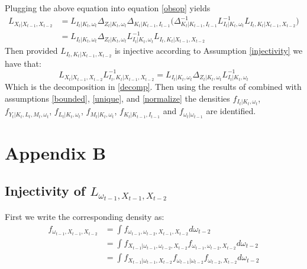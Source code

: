 \documentclass{article}
\begin{document}
Plugging the above equation into equation \eqref{obsop} yields
\begin{equation*}
\begin{split}
L_{X_{t}|X_{t-1}, X_{t-2}}&=L_{I_{t}|K_{t}, \omega_{t}}\Delta_{Z_{t}|K_{t}, \omega_{t}}\Delta_{K_{t}|K_{t-1}, I_{t-1}}\Bigg(\Delta^{-1}_{K_{t}|K_{t-1}, I_{t-1}}L^{-1}_{I_{t}|K_{t}, \omega_{t}}L_{I_{t}, K_{t}|X_{t-1}, X_{t-2}}\Bigg)\\
&=L_{I_{t}|K_{t}, \omega_{t}}\Delta_{Z_{t}|K_{t}, \omega_{t}}L^{-1}_{I_{t}|K_{t}, \omega_{t}}L_{I_{t}, K_{t}|X_{t-1}, X_{t-2}}
\end{split}
\end{equation*}
Then provided $L_{I_{t}, K_{t}|X_{t-1}, X_{t-2}}$ is injective according to Assumption \eqref{injectivity} we have that:
\begin{equation*}
L_{X_{t}|X_{t-1}, X_{t-2}}L^{-1}_{I_{t}, K_{t}|X_{t-1}, X_{t-2}}=L_{I_{t}|K_{t}, \omega_{t}}\Delta_{Z_{t}|K_{t}, \omega_{t}}L^{-1}_{I_{t}|K_{t}, \omega_{t}}
\end{equation*}
Which is the decomposition in \eqref{decomp}. Then using the results of \cite{Hu2008} combined with assumptions \eqref{bounded}, \eqref{unique}, and \eqref{normalize} the densities $f_{I_{t}|K_{t}, \omega_{t}}$, $f_{Y_{t}|K_{t}, L_{t}, M_{t}, \omega_{t}}$, $f_{L_{t}|K_{t}, \omega_{t}}$, $f_{M_{t}|K_{t}, \omega_{t}}$, $f_{K_{t}|K_{t-1}, I_{t-1}}$ and $f_{\omega_{t}|\omega_{t-1}}$ are identified.
\pagebreak
\newpage
\section*{Appendix B}
\subsection*{Injectivity of $L_{\omega_{t-1}, X_{t-1}, X_{t-2}}$}
First we write the corresponding density as:
\begin{equation*}
\begin{split}
f_{\omega_{t-1}, X_{t-1}, X_{t-2}}&=\int f_{\omega_{t-1}, \omega_{t-2}, X_{t-1}, X_{t-2}}d\omega_{t-2}\\
&=\int f_{X_{t-1}|\omega_{t-1}, \omega_{t-2}, X_{t-2}}f_{\omega_{t-1}, \omega_{t-2}, X_{t-2}}d\omega_{t-2}\\
&=\int f_{X_{t-1}|\omega_{t-1}, X_{t-2}}f_{\omega_{t-1}|\omega_{t-2}}f_{\omega_{t-2}, X_{t-2}}d\omega_{t-2}\\
\end{split}
\end{equation*}
\end{document}
